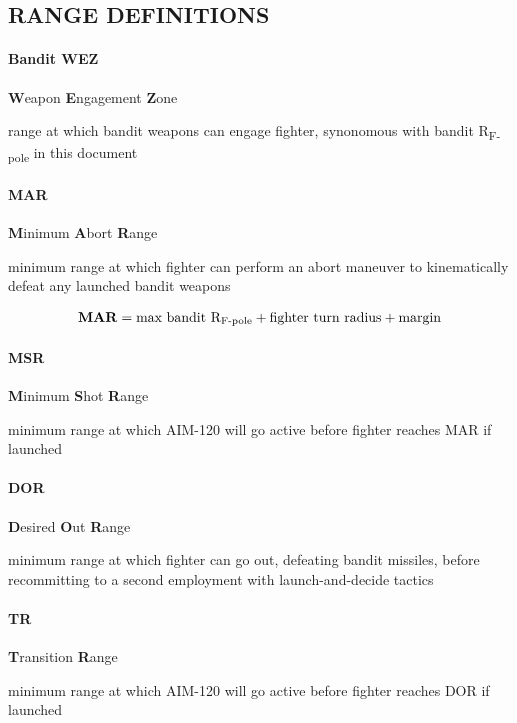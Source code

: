 \subsection{RANGE DEFINITIONS}

\paragraph{Bandit WEZ}
\textbf{W}eapon \textbf{E}ngagement \textbf{Z}one

\medskip
range at which bandit weapons can engage fighter, synonomous with bandit R\textsubscript{F-pole} in this document

\paragraph{MAR} 
\textbf{M}inimum \textbf{A}bort \textbf{R}ange

\medskip
minimum range at which fighter can perform an abort maneuver to kinematically defeat any launched bandit weapons 

\begin{align*}
    \text{\textbf{MAR}}
    = \text{max bandit R\textsubscript{F-pole}}
    + \text{fighter turn radius}
    + \text{margin}
\end{align*}

\paragraph{MSR} 
\textbf{M}inimum \textbf{S}hot \textbf{R}ange

\medskip
minimum range at which AIM-120 will go active before fighter reaches MAR if launched

\paragraph{DOR} 
\textbf{D}esired \textbf{O}ut \textbf{R}ange

\medskip
minimum range at which fighter can go out, defeating bandit missiles, 
before recommitting to a second employment with launch-and-decide tactics

\paragraph{TR} 
\textbf{T}ransition \textbf{R}ange

\medskip
minimum range at which AIM-120 will go active before fighter reaches DOR if launched

